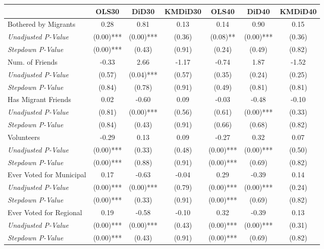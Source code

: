 \begin{tabular}{l c c c c c c}
\toprule
 & OLS30 & DiD30 & KMDiD30 & OLS40 & DiD40 & KMDiD40 \\
\midrule
Bothered by Migrants & 0.28 & 0.81 & 0.13 & 0.14 & 0.90 & 0.15 \\
\quad \textit{Unadjusted P-Value} & (0.00)*** & (0.00)*** & (0.36) & (0.08)** & (0.00)*** & (0.36) \\
\quad \textit{Stepdown P-Value} & (0.00)*** & (0.43) & (0.91) & (0.24) & (0.49) & (0.82) \\
Num. of Friends & -0.33 & 2.66 & -1.17 & -0.74 & 1.87 & -1.52 \\
\quad \textit{Unadjusted P-Value} & (0.57) & (0.04)*** & (0.57) & (0.35) & (0.24) & (0.25) \\
\quad \textit{Stepdown P-Value} & (0.84) & (0.78) & (0.91) & (0.49) & (0.81) & (0.81) \\
Has Migrant Friends & 0.02 & -0.60 & 0.09 & -0.03 & -0.48 & -0.10 \\
\quad \textit{Unadjusted P-Value} & (0.81) & (0.00)*** & (0.56) & (0.61) & (0.00)*** & (0.33) \\
\quad \textit{Stepdown P-Value} & (0.84) & (0.43) & (0.91) & (0.66) & (0.68) & (0.82) \\
Volunteers & -0.29 & 0.13 & 0.09 & -0.27 & 0.32 & 0.07 \\
\quad \textit{Unadjusted P-Value} & (0.00)*** & (0.33) & (0.48) & (0.00)*** & (0.00)*** & (0.50) \\
\quad \textit{Stepdown P-Value} & (0.00)*** & (0.88) & (0.91) & (0.00)*** & (0.69) & (0.82) \\
Ever Voted for Municipal & 0.17 & -0.63 & -0.04 & 0.29 & -0.39 & 0.14 \\
\quad \textit{Unadjusted P-Value} & (0.00)*** & (0.00)*** & (0.79) & (0.00)*** & (0.00)*** & (0.24) \\
\quad \textit{Stepdown P-Value} & (0.00)*** & (0.33) & (0.91) & (0.00)*** & (0.69) & (0.82) \\
Ever Voted for Regional & 0.19 & -0.58 & -0.10 & 0.32 & -0.39 & 0.13 \\
\quad \textit{Unadjusted P-Value} & (0.00)*** & (0.00)*** & (0.43) & (0.00)*** & (0.00)*** & (0.31) \\
\quad \textit{Stepdown P-Value} & (0.00)*** & (0.43) & (0.91) & (0.00)*** & (0.69) & (0.82) \\
\bottomrule
\end{tabular}
